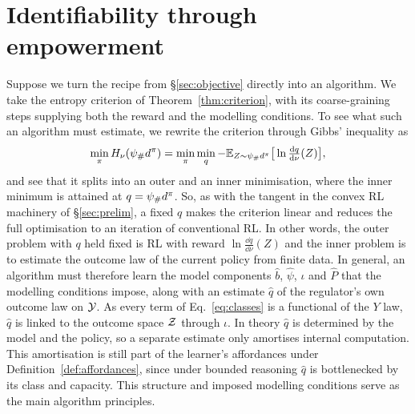 
\section[Identifiability through empowerment]{Identifiability through empowerment}
\label{sec:pomdp}
Suppose we turn the recipe from \S\ref{sec:objective} directly into an algorithm.
We take the entropy criterion of Theorem~\ref{thm:criterion}, with its coarse-graining steps supplying both the reward and the modelling conditions.
To see what such an algorithm must estimate, we rewrite the criterion through Gibbs' inequality as
\begin{equation} \label{eq:gibbs_criterion}
  \min_\pi H_\nu(\psi_\#d^{\pi}) = \min_\pi \min_q -\mathbb E_{Z \sim \psi_\#d^{\pi}}\big[\ln \tfrac{\mathrm d q}{\mathrm d\nu}(Z)\big],
\end{equation}
and see that it splits into an outer and an inner minimisation, where the inner minimum is attained at $q = \psi_\#d^{\pi}$.
So, as with the tangent in the convex RL machinery of \S\ref{sec:prelim}, a fixed $q$ makes the criterion linear and reduces the full optimisation to an iteration of conventional RL.
In other words, the outer problem with $q$ held fixed is RL with reward $\ln \tfrac{\dd q}{\dd\nu}(Z)$ and the inner problem is to estimate the outcome law of the current policy from finite data.
In general, an algorithm must therefore learn the model components $\hat b$, $\hat\psi$, $\iota$ and $\hat P$ that the modelling conditions impose, along with an estimate $\hat q$ of the regulator's own outcome law on $\mathcal Y$.
As every term of Eq.~\eqref{eq:classes} is a functional of the $Y$ law, $\hat q$ is linked to the outcome space $\mathcal Z$ through $\iota$.
In theory $\hat q$ is determined by the model and the policy, so a separate estimate only amortises internal computation.
This amortisation is still part of the learner's affordances under Definition~\ref{def:affordances}, since under bounded reasoning $\hat q$ is bottlenecked by its class and capacity.
This structure and imposed modelling conditions serve as the main algorithm principles.

